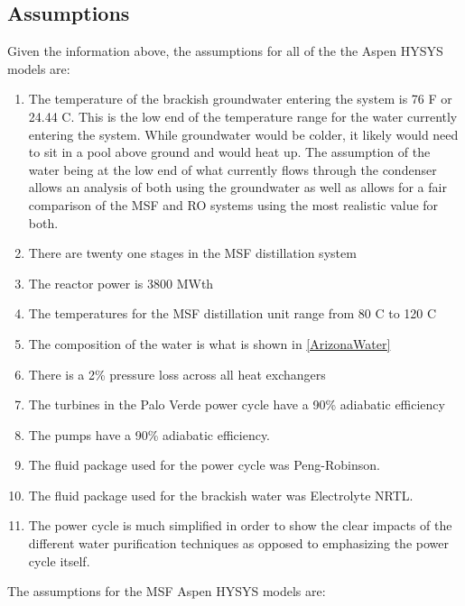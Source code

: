 \documentclass[12pt]{UIdahoMastersThesis}
\begin{document}

\subsection{Assumptions}

Given the information above, the assumptions for all of the the Aspen HYSYS models are:
\begin{enumerate}
\item The temperature of the brackish groundwater entering the system is 76 \degree F or 24.44 \degree C. This is the low end of the temperature range for the water currently entering the system. While groundwater would be colder, it likely would need to sit in a pool above ground and would heat up. The assumption of the water being at the low end of what currently flows through the condenser allows an analysis of both using the groundwater as well as allows for a fair comparison of the MSF and RO systems using the most realistic value for both. 
\item There are twenty one stages in the MSF distillation system \cite{Bodalal2010} 
\item The reactor power is 3800 MWth
\item The temperatures for the MSF distillation unit range from 80 \degree C to 120 \degree C
\item The composition of the water is what is shown in \ref{ArizonaWater}
\item There is a 2\% pressure loss across all heat exchangers
\item The turbines in the Palo Verde power cycle have a 90\% adiabatic efficiency
\item The pumps have a 90\% adiabatic efficiency.
\item The fluid package used for the power cycle was Peng-Robinson.
\item The fluid package used for the brackish water was Electrolyte NRTL.
\item The power cycle is much simplified in order to show the clear impacts of the different water purification techniques as opposed to emphasizing the power cycle itself.
\end{enumerate}

The assumptions for the MSF Aspen HYSYS models are:
\end{document}
